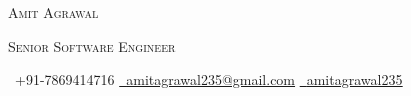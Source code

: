 

  
{\centering
    { \Huge \scshape Amit Agrawal\par}
    { \scshape Senior Software Engineer\par} 
    \vspace{4pt}
    \small \raisebox{-0.1\height}\faPhone\ +91-7869414716 
    \quad\textbar\quad \href{mailto:amitagrawal235@gmail.com}{\raisebox{-0.2\height}\faEnvelope\  \underline{amitagrawal235@gmail.com}} 
    \quad\textbar\quad \href{https://linkedin.com/in/amitagrawal235/}{\raisebox{-0.2\height}\faLinkedin\ \underline{amitagrawal235}}
    \par
}
